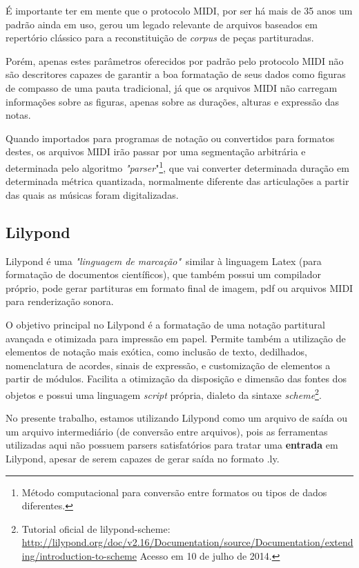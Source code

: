 \documentclass[
	12pt,				%
	openright,			%
	twoside,			%
	a4paper,			%
	english,			%
	french,				%
	spanish,			%
	brazil				%
	]{abntex2}
\begin{document}
É importante ter em mente que o protocolo MIDI, por ser há mais de 35 anos um padrão ainda em uso, gerou um legado relevante de arquivos baseados em repertório clássico para a reconstituição de \textit{corpus} de peças partituradas. 

Porém, apenas estes parâmetros oferecidos por padrão pelo protocolo MIDI não são descritores capazes de garantir a boa formatação de seus dados como figuras de compasso de uma pauta tradicional, já que os arquivos MIDI não carregam informações sobre as figuras, apenas sobre as durações, alturas e expressão das notas.

Quando importados para programas de notação ou convertidos para formatos destes, os arquivos MIDI irão passar por uma segmentação arbitrária e determinada pelo algoritmo \textit{"parser}"\footnote{Método computacional para conversão entre formatos ou tipos de dados diferentes.}, que vai converter determinada duração em determinada métrica quantizada, normalmente diferente das articulações a partir das quais as músicas foram digitalizadas.


\subsection{Lilypond}

Lilypond é uma  \textit{"linguagem de marcação"}\ similar à linguagem Latex (para formatação de documentos científicos), que também possui um compilador próprio, pode gerar partituras em formato final de imagem, pdf ou arquivos MIDI para renderização sonora.

O objetivo principal no Lilypond é a formatação de uma notação partitural avançada e otimizada para impressão em papel. Permite também a utilização de elementos de notação mais exótica, como inclusão de texto, dedilhados, nomenclatura de acordes, sinais de expressão, e customização de elementos a partir de módulos. Facilita a otimização da disposição e dimensão das fontes dos objetos e possui uma linguagem \textit{script} própria, dialeto da sintaxe \textit{scheme}\footnote{Tutorial oficial de lilypond-scheme: \url{http://lilypond.org/doc/v2.16/Documentation/source/Documentation/extending/introduction-to-scheme} Acesso em 10 de julho de 2014.}.

No presente trabalho, estamos utilizando Lilypond como um arquivo de saída ou um arquivo intermediário (de conversão entre arquivos), pois as ferramentas utilizadas aqui não possuem parsers satisfatórios para tratar uma \textbf{entrada} em Lilypond, apesar de serem capazes de gerar saída no formato .ly.
\end{document}
